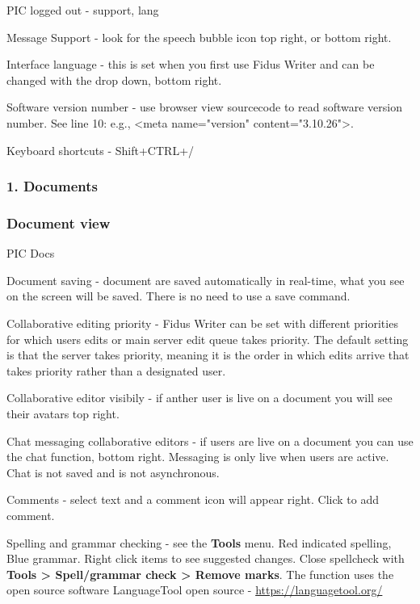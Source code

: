 \documentclass{article}
\begin{document}
PIC logged out - support, lang


Message Support - look for the speech bubble icon top right, or bottom right.


Interface language - this is set when you first use Fidus Writer and can be changed with the drop down, bottom right.


Software version number - use browser view sourcecode to read software version number. See line 10: e.g., <meta name="version" content="3.10.26">.


Keyboard shortcuts - Shift+CTRL+/


\subsubsection{1. Documents}\label{H1552973}



\subsubsection{Document view}\label{H2380763}



PIC Docs


Document saving - document are saved automatically in real-time, what you see on the screen will be saved. There is no need to use a save command.


Collaborative editing priority - Fidus Writer can be set with different priorities for which users edits or main server edit queue takes priority. The default setting is that the server takes priority, meaning it is the order in which edits arrive that takes priority rather than a designated user.


Collaborative editor visibily - if anther user is live on a document you will see their avatars top right.


Chat messaging collaborative editors - if users are live on a document you can use the chat function, bottom right. Messaging is only live when users are active. Chat is not saved and is not asynchronous.


Comments - select text and a comment icon will appear right. Click to add comment.


Spelling and grammar checking - see the \textbf{Tools} menu. Red indicated spelling, Blue grammar. Right click items to see suggested changes. Close spellcheck with \textbf{Tools > Spell/grammar check > Remove marks}. The function uses the open source software LanguageTool open source - \href{https://languagetool.org/}{https://languagetool.org/} 
\end{document}
